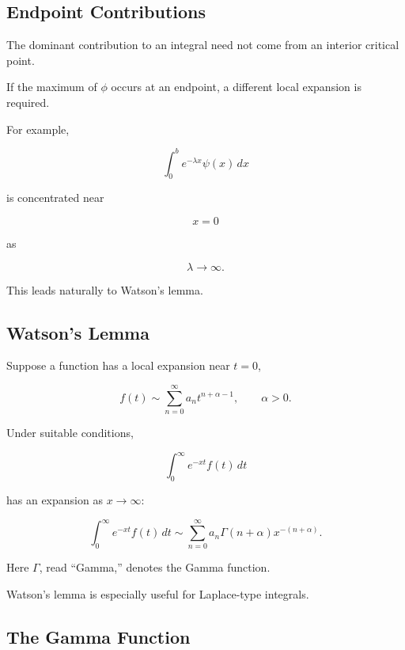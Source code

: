 \subsection{Endpoint Contributions}
\label{subsec:laplace-endpoint-contributions}

The dominant contribution to an integral need not come from an interior
critical point.

If the maximum of \(\phi\) occurs at an endpoint, a different local
expansion is required.

For example,

\[
\int_0^b
e^{-\lambda x}\psi(x)\,dx
\]

is concentrated near

\[
x=0
\]

as

\[
\lambda\to\infty.
\]

This leads naturally to Watson's lemma.

\subsection{Watson's Lemma}
\label{subsec:watsons-lemma}

Suppose a function has a local expansion near \(t=0\),

\[
f(t)
\sim
\sum_{n=0}^{\infty}
a_nt^{n+\alpha-1},
\qquad
\alpha>0.
\]

Under suitable conditions,

\[
\int_0^\infty
e^{-xt}f(t)\,dt
\]

has an expansion as \(x\to\infty\):

\[
\boxed{
\int_0^\infty
e^{-xt}f(t)\,dt
\sim
\sum_{n=0}^{\infty}
a_n
\Gamma(n+\alpha)
x^{-(n+\alpha)}.
}
\]

Here \(\Gamma\), read ``Gamma,'' denotes the Gamma function.

Watson's lemma is especially useful for Laplace-type integrals.

\subsection{The Gamma Function}
\label{subsec:asymptotic-gamma-function}

